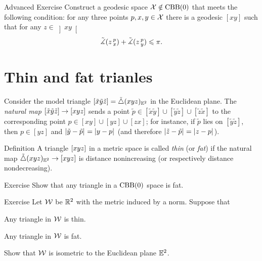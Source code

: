 \begin{thm}{Advanced Exercise} \label{ex:urysohn}
Construct a geodesic space $\mathcal{X}\notin\mathrm{CBB}(0)$ that meets the following condition: for any three points $p,x,y\in \mathcal{X}$ there is a geodesic $[x y]$ such that for any $z\in \left]x y\right[$
\[\tilde\measuredangle(z\,{}^{p}_{x})+\tilde\measuredangle(z\,{}^{p}_{y})
\leqslant
\pi.\]
\end{thm}

\section{Thin and fat trianles}

Consider the  model triangle $\trig{\tilde x}{\tilde y}{\tilde z}\z=\modtrig{}({x}{y}{z})_{\EE^2}$ in the Euclidean plane.
The \emph{natural map} $\trig{\tilde x}{\tilde y}{\tilde z}\z\to \trig{x}{y}{z}$ 
sends a point $\tilde p\in[\tilde x\tilde y]\cup[\tilde y\tilde z]\cup[\tilde z\tilde x]$ to the corresponding point $p\in[ x y]\cup[y z]\cup[ z x]$;
for instance, if $\tilde p$ lies on $[\tilde y\tilde z]$,
then $p\in [y z]$ and $\dist{\tilde y}{\tilde p}{}=\dist{y}{p}{}$ (and therefore $\dist{\tilde z}{\tilde p}{}=\dist{z}{p}{}$).
 
\begin{thm}{Definition}\label{def:k-thin-}
A triangle $[xyz]$ in a metric space
is called \emph{thin} (or \emph{fat}) if the natural map $\tilde\triangle{}({x}{y}{z})_{\mathbb{E}^2}\to [xyz]$ is distance nonincreasing (or respectively distance nondecreasing).

\end{thm}

\begin{thm}{Exercise}\label{ex:fat}
Show that any triangle in a $\mathrm{CBB}(0)$ space is fat.
\end{thm}

\begin{thm}{Exercise}\label{ex:normCBB}
Let $\mathcal{W}$ be $\mathbb{R}^2$ with the metric induced by a norm.
Suppose that 

\begin{subthm}{}
Any triangle in $\mathcal{W}$ is thin.
\end{subthm}

\begin{subthm}{}
Any triangle in $\mathcal{W}$ is fat.
\end{subthm}

Show that $\mathcal{W}$ is isometric to the Euclidean plane $\mathbb{E}^2$.
\end{thm}


